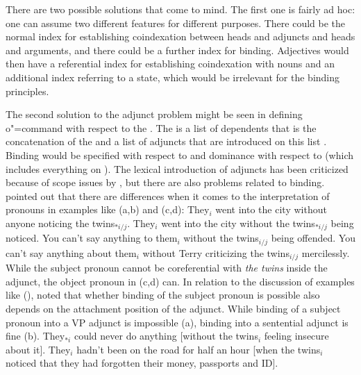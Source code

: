 \documentclass[output=paper,biblatex,babelshorthands,newtxmath,draftmode,colorlinks,citecolor=brown]{langscibook}
\begin{document}
There are two possible solutions that come to mind. The first one is fairly ad
hoc: 
one can assume two different features for different purposes. There could be the normal index
for establishing coindexation between heads and adjuncts and heads and arguments, and there could be
a further index for binding. Adjectives would then have a referential index for establishing
coindexation with nouns and an additional index referring to a state, which would be irrelevant for the
binding principles.

The second solution to the adjunct problem might be seen in defining o"=command with respect to the \depsl. The \depsl is a list
of dependents that is the concatenation of the \argstl and a list of adjuncts that are introduced on
this list \citep*[]{BMS2001a}. Binding would be specified with respect to \argst and dominance with
respect to \deps (which includes everything on \argst). The lexical introduction of adjuncts has
been criticized because of scope issues by \citet[]{LH2006a}, but there are also problems related to
binding. \citet[]{HL96a} pointed out that there are differences when it comes to the
interpretation of pronouns in examples like (a,b) and (c,d):
\eal
\ex They$_i$ went into the city without anyone noticing the twins$_{*i/j}$.
\ex They$_i$ went into the city without the twins$_{*i/j}$ being noticed.
\ex You can't say anything to them$_i$ without the twins$_{i/j}$ being offended.
\ex You can't say anything about them$_i$ without Terry criticizing the twins$_{i/j}$ mercilessly.
\zl
\largerpage[2]
While the subject pronoun cannot be coreferential with \emph{the twins} inside the adjunct, the object pronoun in
(c,d) can.
In relation to the discussion of examples like (), \citet[]{Walker2011a} noted that whether binding of the subject pronoun is possible also
depends on the attachment position of the adjunct. While binding of a subject pronoun into a VP
adjunct is impossible (a), binding into a sentential adjunct is fine (b).
\ealnoraggedright
\ex They$_{*i}$ could never do anything [without the twins$_i$ feeling insecure about it].
\ex They$_i$ hadn’t been on the road for half an hour [when the twins$_i$ noticed that they had forgotten their money, passports and ID].
\end{document}
